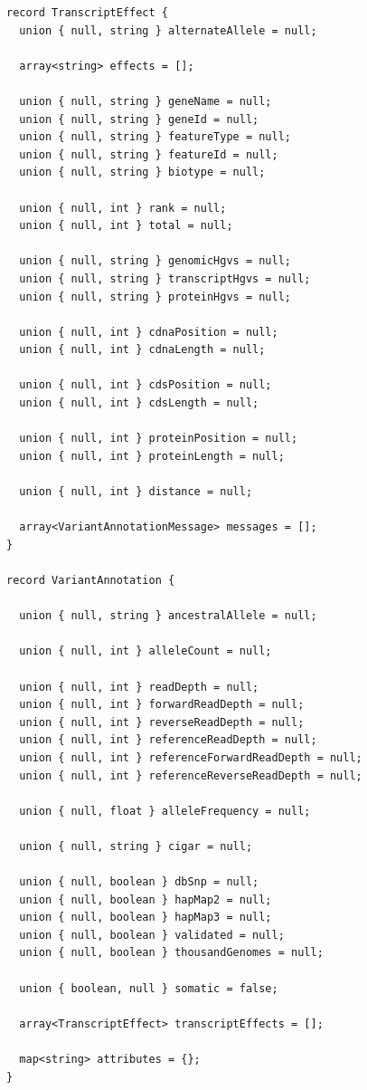\documentclass[phd]{ucbthesis}
\begin{document}
\begin{lstlisting}[caption=\textsc{ADAM} variant annotation schemas]
record TranscriptEffect {
  union { null, string } alternateAllele = null;

  array<string> effects = [];

  union { null, string } geneName = null;
  union { null, string } geneId = null;
  union { null, string } featureType = null;
  union { null, string } featureId = null;
  union { null, string } biotype = null;

  union { null, int } rank = null;
  union { null, int } total = null;

  union { null, string } genomicHgvs = null;
  union { null, string } transcriptHgvs = null;
  union { null, string } proteinHgvs = null;

  union { null, int } cdnaPosition = null;
  union { null, int } cdnaLength = null;

  union { null, int } cdsPosition = null;
  union { null, int } cdsLength = null;

  union { null, int } proteinPosition = null;
  union { null, int } proteinLength = null;

  union { null, int } distance = null;

  array<VariantAnnotationMessage> messages = [];
}

record VariantAnnotation {

  union { null, string } ancestralAllele = null;

  union { null, int } alleleCount = null;

  union { null, int } readDepth = null;
  union { null, int } forwardReadDepth = null;
  union { null, int } reverseReadDepth = null;
  union { null, int } referenceReadDepth = null;
  union { null, int } referenceForwardReadDepth = null;
  union { null, int } referenceReverseReadDepth = null;

  union { null, float } alleleFrequency = null;

  union { null, string } cigar = null;

  union { null, boolean } dbSnp = null;
  union { null, boolean } hapMap2 = null;
  union { null, boolean } hapMap3 = null;
  union { null, boolean } validated = null;
  union { null, boolean } thousandGenomes = null;

  union { boolean, null } somatic = false;

  array<TranscriptEffect> transcriptEffects = [];

  map<string> attributes = {};
}
\end{lstlisting}
\end{document}
